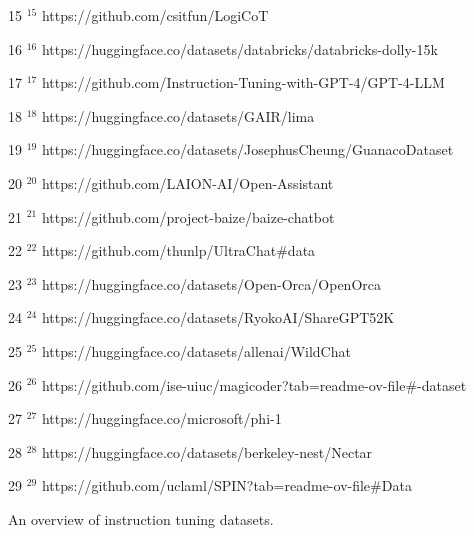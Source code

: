 \begin{table*}[t]
\begin{multicols}{2}
\begin{tablenotes}
\item[15] \label{id:15} {$^{15}$  https://github.com/csitfun/LogiCoT}
\item[16] \label{id:16} {$^{16}$ https://huggingface.co/datasets/databricks/databricks-dolly-15k}
\item[17] \label{id:17} {$^{17}$ https://github.com/Instruction-Tuning-with-GPT-4/GPT-4-LLM}
\item[18] \label{id:18} {$^{18}$ https://huggingface.co/datasets/GAIR/lima}
\item[19] \label{id:19} {$^{19}$ https://huggingface.co/datasets/JosephusCheung/GuanacoDataset}
\item[20] \label{id:20} {$^{20}$ https://github.com/LAION-AI/Open-Assistant}
\item[21] \label{id:21} {$^{21}$ https://github.com/project-baize/baize-chatbot}
\item[22] \label{id:22} {$^{22}$ https://github.com/thunlp/UltraChat\#data}
\item[23] \label{id:23} {$^{23}$ https://huggingface.co/datasets/Open-Orca/OpenOrca}
\item[24] \label{id:24} {$^{24}$ https://huggingface.co/datasets/RyokoAI/ShareGPT52K}
\item[25] \label{id:25} {$^{25}$ https://huggingface.co/datasets/allenai/WildChat}
\item[26] \label{id:26} {$^{26}$ https://github.com/ise-uiuc/magicoder?tab=readme-ov-file\#-dataset}
\item[27] \label{id:27} {$^{27}$ https://huggingface.co/microsoft/phi-1}
\item[28] \label{id:28} {$^{28}$ https://huggingface.co/datasets/berkeley-nest/Nectar}
\item[29] \label{id:29} {$^{29}$ https://github.com/uclaml/SPIN?tab=readme-ov-file\#Data}
\end{tablenotes}
\end{multicols}
\caption{An overview of instruction tuning datasets.}
\label{tab:llms_traindata_table}
\end{table*}